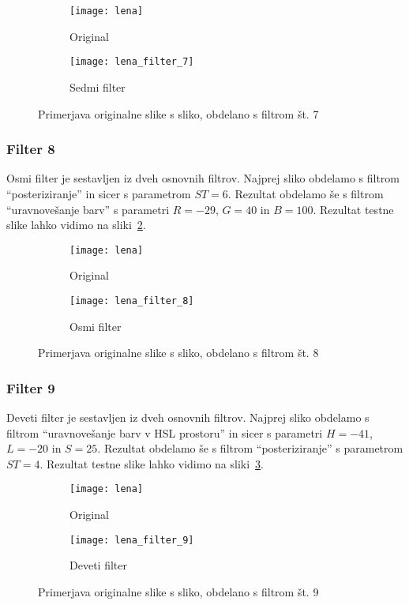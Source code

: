 \begin{figure}[!ht]
    \centering
    \begin{subfigure}[b]{0.4\textwidth}
        \texttt{[image: lena]}
        \caption{Original}
    \end{subfigure}
    \begin{subfigure}[b]{0.4\textwidth}
        \texttt{[image: lena\_filter\_7]}
        \caption{Sedmi filter}
    \end{subfigure}
    \caption{Primerjava originalne slike s sliko, obdelano s filtrom št. 7}
    \label{fig:lena_filter_7}
\end{figure}


\subsubsection*{Filter 8}
Osmi filter je sestavljen iz dveh osnovnih filtrov. Najprej sliko obdelamo s
filtrom ``posteriziranje'' in sicer s parametrom $ST = 6$. Rezultat obdelamo
še s filtrom ``uravnovešanje barv'' s parametri $R = -29$, $G = 40$ in $B = 100$.
Rezultat testne slike lahko vidimo na sliki~\ref{fig:lena_filter_8}.

\begin{figure}[!ht]
    \centering
    \begin{subfigure}[b]{0.4\textwidth}
        \texttt{[image: lena]}
        \caption{Original}
    \end{subfigure}
    \begin{subfigure}[b]{0.4\textwidth}
        \texttt{[image: lena\_filter\_8]}
        \caption{Osmi filter}
    \end{subfigure}
    \caption{Primerjava originalne slike s sliko, obdelano s filtrom št. 8}
    \label{fig:lena_filter_8}
\end{figure}


\subsubsection*{Filter 9}
Deveti filter je sestavljen iz dveh osnovnih filtrov. Najprej sliko obdelamo s
filtrom ``uravnovešanje barv v HSL prostoru'' in sicer s parametri $H = -41$,
$L = -20$ in $S = 25$. Rezultat obdelamo še s filtrom ``posteriziranje'' s
parametrom $ST = 4$. Rezultat testne slike lahko vidimo na
sliki~\ref{fig:lena_filter_9}.

\begin{figure}[!ht]
    \centering
    \begin{subfigure}[b]{0.4\textwidth}
        \texttt{[image: lena]}
        \caption{Original}
    \end{subfigure}
    \begin{subfigure}[b]{0.4\textwidth}
        \texttt{[image: lena\_filter\_9]}
        \caption{Deveti filter}
    \end{subfigure}
    \caption{Primerjava originalne slike s sliko, obdelano s filtrom št. 9}
    \label{fig:lena_filter_9}
\end{figure}


